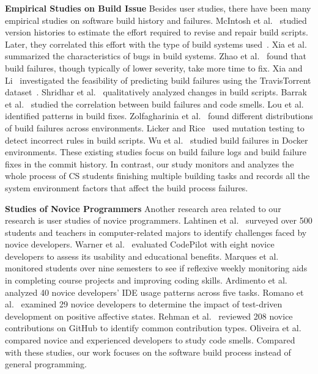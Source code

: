 \textbf{Empirical Studies on Build Issue}
Besides user studies, there have been many empirical studies on software build history and failures. McIntosh et al.~\cite{mcintosh2011empirical} studied version histories to estimate the effort required to revise and repair build scripts. Later, they correlated this effort with the type of build systems used~\cite{mcintosh2015large}. Xia et al.~\cite{xia2014empirical} summarized the characteristics of bugs in build systems. Zhao et al.~\cite{zhao2014empirical} found that build failures, though typically of lower severity, take more time to fix. Xia and Li~\cite{xia2014empirical} investigated the feasibility of predicting build failures using the TravisTorrent dataset~\cite{beller2017travistorrent}. Shridhar et al.~\cite{shridhar2014qualitative} qualitatively analyzed changes in build scripts. Barrak et al.~\cite{barrak2021builds} studied the correlation between build failures and code smells. Lou et al.~\cite{lou2020understanding} identified patterns in build fixes. Zolfagharinia et al.~\cite{zolfagharinia2017not} found different distributions of build failures across environments. Licker and Rice~\cite{licker2019detecting} used mutation testing to detect incorrect rules in build scripts. Wu et al.~\cite{wu2020empirical} studied build failures in Docker environments. 
These existing studies focus on build failure logs and build failure fixes in the commit history. In contrast, our study monitors and analyzes the whole process of CS students finishing multiple building tasks and records all the system environment factors that affect the build process failures.

\textbf{Studies of Novice Programmers}
Another research area related to our research is user studies of novice programmers. 
Lahtinen et al.~\cite{lahtinen2005study} surveyed over 500 students and teachers in computer-related majors to identify challenges faced by novice developers. Warner et al.~\cite{warner2017codepilot} evaluated CodePilot with eight novice developers to assess its usability and educational benefits. Marques et al.~\cite{marques2017enhancing} monitored students over nine semesters to see if reflexive weekly monitoring aids in completing course projects and improving coding skills. Ardimento et al.~\cite{ardimento2019evaluating} analyzed 40 novice developers' IDE usage patterns across five tasks. Romano et al.~\cite{romano2019empirical} examined 29 novice developers to determine the impact of test-driven development on positive affective states. Rehman et al.~\cite{rehman2020newcomer} reviewed 208 novice contributions on GitHub to identify common contribution types. Oliveira et al.~\cite{oliveira2020collaborative} compared novice and experienced developers to study code smells.
Compared with these studies, our work focuses on the software build process instead of general programming.